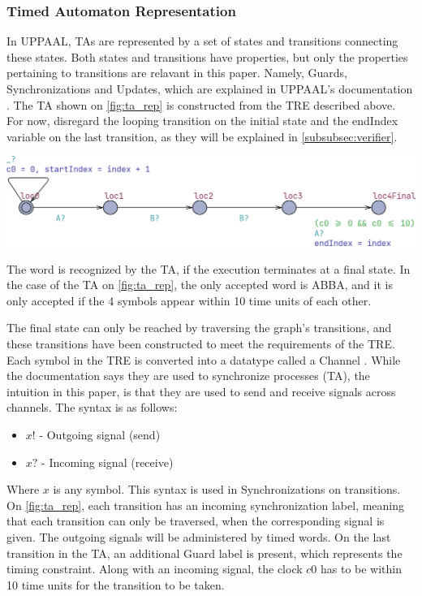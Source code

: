 \subsubsection{Timed Automaton Representation}\label{subsubsec:ta_rep}
In UPPAAL, TAs are represented by a set of states and transitions connecting these states.
Both states and transitions have properties, but only the properties pertaining to transitions are relavant in this paper. Namely, Guards, Synchronizations and Updates, which are explained in UPPAAL's documentation \cite{UPPAAL}.
The TA shown on \cref{fig:ta_rep} is constructed from the TRE described above. For now, disregard the looping transition on the initial state and the endIndex variable on the last transition, as they will be explained in \cref{subsubsec:verifier}.
\begin{center}
    \includegraphics[width=\columnwidth]{Documents/Diagrams/CheckingFigures/checking_tarep.png}
    \label{fig:ta_rep}
\end{center}
The word is recognized by the TA, if the execution terminates at a final state.
In the case of the TA on \cref{fig:ta_rep}, the only accepted word is ABBA, and it is only accepted if the 4 symbols appear within 10 time units of each other.

The final state can only be reached by traversing the graph's transitions, and these transitions have been constructed to meet the requirements of the TRE. Each symbol in the TRE is converted into a datatype called a Channel \cite{UPPAAL}. While the documentation says they are used to synchronize processes (TA), the intuition in this paper, is that they are used to send and receive signals across channels. The syntax is as follows:
\begin{itemize}
    \setlength\itemsep{-0.5em}
    \item $x!$ - Outgoing signal (send)
    \item $x?$ - Incoming signal (receive)
\end{itemize}
Where $x$ is any symbol. This syntax is used in Synchronizations on transitions. On \cref{fig:ta_rep}, each transition has an incoming synchronization label, meaning that each transition can only be traversed, when the corresponding signal is given. The outgoing signals will be administered by timed words. On the last transition in the TA, an additional Guard label is present, which represents the timing constraint. Along with an incoming signal, the clock $c0$ has to be within 10 time units for the transition to be taken.

